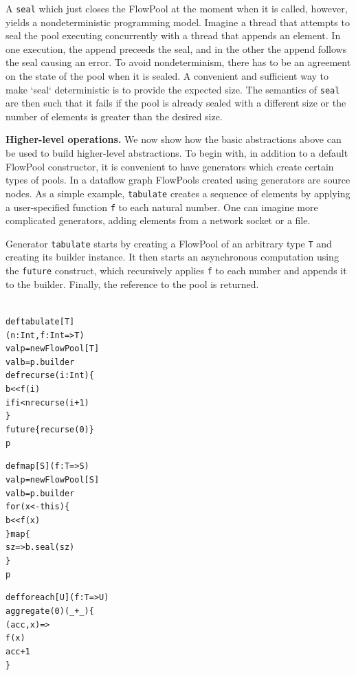 \documentclass[runningheads,a4paper]{llncs}
\begin{document}
A \verb=seal= which just closes the FlowPool at the moment when it
is called, however, yields a nondeterministic programming model.
Imagine a thread that attempts to seal the pool executing concurrently
with a thread that appends an element.
In one execution, the append preceeds the seal, and in the other
the append follows the seal causing an error.
To avoid nondeterminism, there has to be an agreement on the
state of the pool when it is sealed.
A convenient and sufficient way to make `seal` deterministic
is to provide the expected size.
The semantics of \verb=seal= are then such that it fails if the pool
is already sealed with a different size or the number of elements
is greater than the desired size.

\textbf{Higher-level operations.}
We now show how the basic abstractions above can be used
to build higher-level abstractions.
To begin with, in addition to a default FlowPool constructor, it is
convenient to have generators which create certain types of pools.
In a dataflow graph FlowPools created using generators
are source nodes.
As a simple example, \verb=tabulate= creates a sequence of elements
by applying a user-specified function \verb=f= to each natural number.
One can imagine more complicated generators, adding elements from a
network socket or a file.

Generator \verb=tabulate= starts by creating a FlowPool of an
arbitrary type \verb=T= and creating its builder instance.
It then starts an asynchronous computation using the \verb=future=
construct, which recursively applies \verb=f= to each number and
appends it to the builder.
Finally, the reference to the pool is returned.

\noindent
\begin{minipage}[b]{4.2 cm}
\begin{alltt}
{\scriptsize
def tabulate[T]
  (n: Int, f: Int => T)
  val p = new FlowPool[T]
  val b = p.builder
  def recurse(i: Int) \{
    b << f(i)
    if i < n recurse(i + 1)
  \}
  future \{ recurse(0) \}
  p
}
\end{alltt}
\end{minipage}\begin{minipage}[b]{4 cm}
\begin{alltt}
{\scriptsize
def map[S](f: T => S)
  val p = new FlowPool[S]
  val b = p.builder
  for (x <- this) \{
    b << f(x)
  \} map \{
    sz => b.seal(sz)
  \}
  p

}
\end{alltt}
\end{minipage}
\begin{minipage}[b]{2.5 cm}
\begin{alltt}
{\scriptsize
def foreach[U](f: T => U)
  aggregate(0)(_ + _) \{
    (acc, x) =>
    f(x)
    acc + 1
  \}




}
\end{alltt}
\end{minipage}
\end{document}
